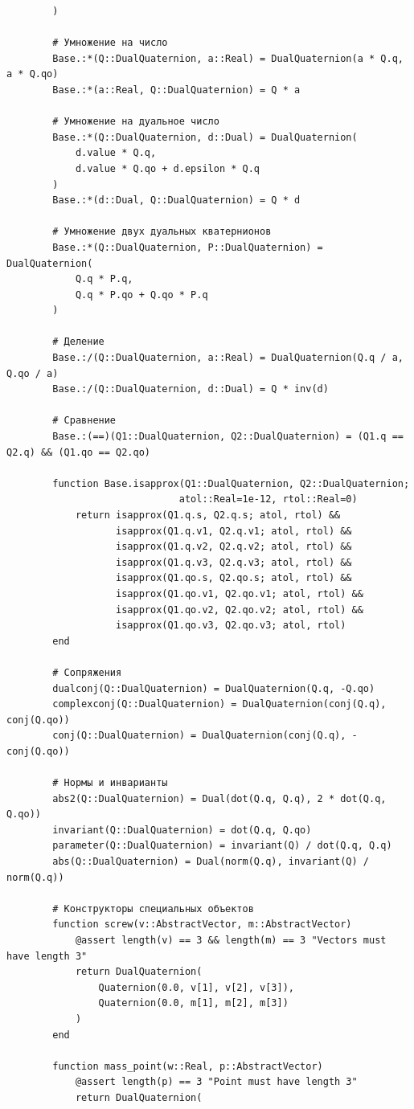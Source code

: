 \begin{verbatim}
        )
        
        # Умножение на число
        Base.:*(Q::DualQuaternion, a::Real) = DualQuaternion(a * Q.q, a * Q.qo)
        Base.:*(a::Real, Q::DualQuaternion) = Q * a
        
        # Умножение на дуальное число
        Base.:*(Q::DualQuaternion, d::Dual) = DualQuaternion(
            d.value * Q.q,
            d.value * Q.qo + d.epsilon * Q.q
        )
        Base.:*(d::Dual, Q::DualQuaternion) = Q * d
        
        # Умножение двух дуальных кватернионов
        Base.:*(Q::DualQuaternion, P::DualQuaternion) = DualQuaternion(
            Q.q * P.q,
            Q.q * P.qo + Q.qo * P.q
        )
        
        # Деление
        Base.:/(Q::DualQuaternion, a::Real) = DualQuaternion(Q.q / a, Q.qo / a)
        Base.:/(Q::DualQuaternion, d::Dual) = Q * inv(d)
        
        # Сравнение
        Base.:(==)(Q1::DualQuaternion, Q2::DualQuaternion) = (Q1.q == Q2.q) && (Q1.qo == Q2.qo)
        
        function Base.isapprox(Q1::DualQuaternion, Q2::DualQuaternion; 
                              atol::Real=1e-12, rtol::Real=0)
            return isapprox(Q1.q.s, Q2.q.s; atol, rtol) &&
                   isapprox(Q1.q.v1, Q2.q.v1; atol, rtol) &&
                   isapprox(Q1.q.v2, Q2.q.v2; atol, rtol) &&
                   isapprox(Q1.q.v3, Q2.q.v3; atol, rtol) &&
                   isapprox(Q1.qo.s, Q2.qo.s; atol, rtol) &&
                   isapprox(Q1.qo.v1, Q2.qo.v1; atol, rtol) &&
                   isapprox(Q1.qo.v2, Q2.qo.v2; atol, rtol) &&
                   isapprox(Q1.qo.v3, Q2.qo.v3; atol, rtol)
        end
        
        # Сопряжения
        dualconj(Q::DualQuaternion) = DualQuaternion(Q.q, -Q.qo)
        complexconj(Q::DualQuaternion) = DualQuaternion(conj(Q.q), conj(Q.qo))
        conj(Q::DualQuaternion) = DualQuaternion(conj(Q.q), -conj(Q.qo))
        
        # Нормы и инварианты
        abs2(Q::DualQuaternion) = Dual(dot(Q.q, Q.q), 2 * dot(Q.q, Q.qo))
        invariant(Q::DualQuaternion) = dot(Q.q, Q.qo)
        parameter(Q::DualQuaternion) = invariant(Q) / dot(Q.q, Q.q)
        abs(Q::DualQuaternion) = Dual(norm(Q.q), invariant(Q) / norm(Q.q))
        
        # Конструкторы специальных объектов
        function screw(v::AbstractVector, m::AbstractVector)
            @assert length(v) == 3 && length(m) == 3 "Vectors must have length 3"
            return DualQuaternion(
                Quaternion(0.0, v[1], v[2], v[3]),
                Quaternion(0.0, m[1], m[2], m[3])
            )
        end
        
        function mass_point(w::Real, p::AbstractVector)
            @assert length(p) == 3 "Point must have length 3"
            return DualQuaternion(

\end{verbatim}

